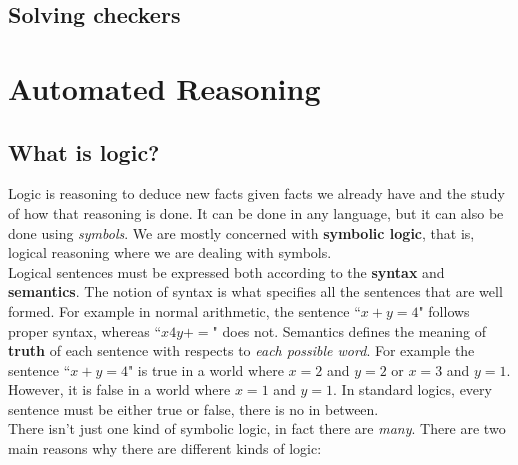 \documentclass{article}
\newcommand{\n}[0]{\\[\baselineskip]}
\begin{document}
\subsection{Solving checkers}

\section{Automated Reasoning}
\subsection{What is logic?}
Logic is reasoning to deduce new facts given facts we already have and the study of how that reasoning is done. It can be done in any language, but it can also be done using \textit{symbols}. We are mostly concerned with \textbf{symbolic logic}, that is, logical reasoning where we are dealing with symbols. 
\n
Logical sentences must be expressed both according to the \textbf{syntax} and \textbf{semantics}. The notion of syntax is what specifies all the sentences that are well formed. For example in normal arithmetic, the sentence ``$x + y = 4$" follows proper syntax, whereas ``$x4y+=$" does not. Semantics defines the meaning of \textbf{truth} of each sentence with respects to \textit{each possible word}. For example the sentence ``$x + y = 4$" is true in a world where $x = 2$ and $y = 2$ or $x = 3$ and $y = 1$. However, it is false in a world where $x = 1$ and $y = 1$. In standard logics, every sentence must be either true or false, there is no in between.
\n 
There isn't just one kind of symbolic logic, in fact there are \textit{many}. There are two main reasons why there are different kinds of logic:
\end{document}
